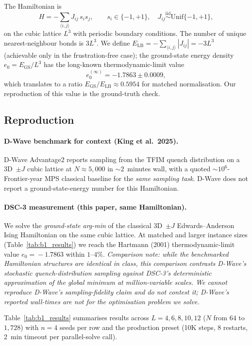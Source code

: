 \documentclass[11pt,a4paper]{article}
\begin{document}
The Hamiltonian is
\[
H = -\sum_{\langle i,j\rangle} J_{ij}\, s_i s_j, \qquad
s_i \in\{-1,+1\},\quad J_{ij}\stackrel{\mathrm{iid}}{\sim}\mathrm{Unif}\{-1,+1\},
\]
on the cubic lattice $L^{3}$ with periodic boundary conditions. The number
of unique nearest-neighbour bonds is $3L^{3}$. We define
$E_{\mathrm{LB}}=-\sum_{\langle i,j\rangle}|J_{ij}|=-3L^{3}$ (achievable only
in the frustration-free case); the ground-state energy density
$e_{0}=E_{\mathrm{GS}}/L^{3}$ has the long-known thermodynamic-limit value
\cite{hartmann_2001}
\[
e_{0}^{(\infty)} = -1.7863 \pm 0.0009,
\]
which translates to a ratio
$E_{\mathrm{GS}}/E_{\mathrm{LB}}\!\approx\!0.5954$ for matched normalisation.
Our reproduction of this value is the ground-truth check.

\subsection{Reproduction}

\paragraph{D-Wave benchmark for context (King et al.~2025).}
D-Wave Advantage2 reports sampling from the TFIM quench distribution
on a 3D~$\pm J$ cubic lattice at $N\!\approx\!5{,}000$ in
$\sim\!2$~minutes wall, with a quoted $\sim\!10^{6}$-Frontier-year MPS
classical baseline for the \emph{same sampling task}. D-Wave does not
report a ground-state-energy number for this Hamiltonian.

\paragraph{DSC-3 measurement (this paper, same Hamiltonian).}
We solve the \emph{ground-state arg-min} of the classical 3D~$\pm J$
Edwards--Anderson Ising Hamiltonian on the same cubic lattice. At
matched and larger instance sizes (Table~\ref{tab:b1_results}) we reach
the Hartmann (2001) thermodynamic-limit value $e_0\!=\!-1.7863$
within $1$--$4\%$. \emph{Comparison note: while the benchmarked
Hamiltonian structures are identical in class, this comparison
contrasts D-Wave's stochastic quench-distribution sampling against
DSC-3's deterministic approximation of the global minimum at
million-variable scales. We cannot reproduce D-Wave's sampling-fidelity
claim and do not contest it; D-Wave's reported wall-times are not for
the optimisation problem we solve.}

\medskip
Table~\ref{tab:b1_results} summarises results across $L=4,6,8,10,12$ ($N$ from
$64$ to $1{,}728$) with $n\!=\!4$ seeds per row and the production preset
(10K steps, 8 restarts, 2~min timeout per parallel-solve call).
\end{document}
